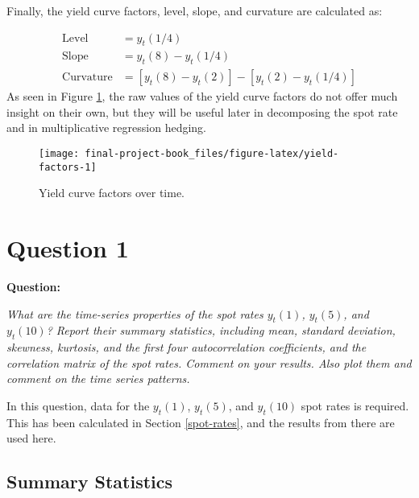 \documentclass[openany]{book}
\theoremstyle{definition}
\theoremstyle{definition}
\theoremstyle{definition}
\theoremstyle{remark}
\begin{document}
Finally, the yield curve factors, level, slope, and curvature are
calculated as:

\[
\begin{aligned}
  \text{Level} &= y_t(1/4) \\
   \text{Slope} &= y_t(8) - y_t(1/4) \\
   \text{Curvature} &= [ y_t(8) - y_t(2) ]  - [ y_t(2) - y_t(1/4) ]
\end{aligned}
\] As seen in Figure \ref{fig:yield-factors}, the raw values of the
yield curve factors do not offer much insight on their own, but they
will be useful later in decomposing the spot rate and in multiplicative
regression hedging.

\small

\begin{figure}[H]

{\centering \texttt{[image: final-project-book\_files/figure-latex/yield-factors-1]} 

}

\caption{Yield curve factors over time.}\label{fig:yield-factors}
\end{figure}

\normalsize

\small

\normalsize

\hypertarget{q1}{%
\chapter{Question 1}\label{q1}}

\textbf{Question:}

\emph{What are the time-series properties of the spot rates \(y_t(1)\),
\(y_t(5)\), and \(y_t(10)\)? Report their summary statistics, including
mean, standard deviation, skewness, kurtosis, and the first four
autocorrelation coefficients, and the correlation matrix of the spot
rates. Comment on your results. Also plot them and comment on the time
series patterns.}

\small

\normalsize

In this question, data for the \(y_t(1)\), \(y_t(5)\), and \(y_t(10)\)
spot rates is required. This has been calculated in Section
\ref{spot-rates}, and the results from there are used here.

\small

\normalsize

\hypertarget{summary-statistics}{%
\section{Summary Statistics}\label{summary-statistics}}
\end{document}

